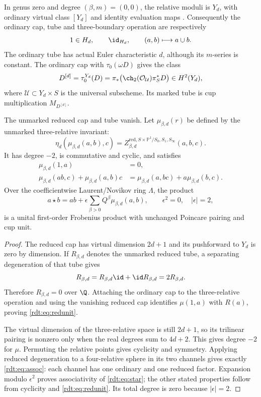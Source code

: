 In genus zero and degree $(\beta,m)=(0,0)$, the relative moduli is
$Y_d$, with ordinary virtual class $[Y_d]$ and identity evaluation
maps \cite[Lemma 5.2]{OberdieckMC}. Consequently the ordinary cap,
tube and three-boundary operation are respectively
\[
 1\in H_d,\qquad \id_{H_d},\qquad (a,b)\longmapsto a\cup b.
\]
The ordinary tube has actual Euler characteristic $d$, although its
$m$-series is constant. The ordinary cap with $\tau_0(\omega D)$
gives the class
\[
 D^{[d]}=\tau_0^{Y_d}(D)=\pi_*\bigl(\ch_2(\mathcal O_{\mathcal U})
                      \pi_S^*D\bigr)\in H^2(Y_d),
\]
where $\mathcal U\subset Y_d\times S$ is the universal subscheme.
Its marked tube is cup multiplication $M_{D^{[d]}}$.

\begin{proposition}
\label{rdt:prop:firstorder}
The unmarked reduced cap and tube vanish. Let $\mu_{\beta,d}(r)$
be defined by the unmarked three-relative invariant:
\[
 \eta_d(\mu_{\beta,d}(a,b),c)
   =Z^{\mathrm{red},S\times\mathbb P^1/S_0,S_1,S_\infty}_{\beta,d}(a,b,c).
\]
It has degree $-2$, is commutative and cyclic, and satisfies
\begin{align}
 \mu_{\beta,d}(1,a)&=0,\label{rdt:eq:redunit}\\
 \mu_{\beta,d}(ab,c)+\mu_{\beta,d}(a,b)c
  &=\mu_{\beta,d}(a,bc)+a\mu_{\beta,d}(b,c).
 \label{rdt:eq:assoc}
\end{align}
Over the coefficientwise Laurent/Novikov ring $\Lambda$, the product
\begin{equation}\label{rdt:eq:star}
 a\star b=ab+\epsilon\sum_{\beta>0}Q^\beta\mu_{\beta,d}(a,b),
 \qquad \epsilon^2=0,\quad |\epsilon|=2,
\end{equation}
is a unital first-order Frobenius product with unchanged Poincare
pairing and cup unit.
\end{proposition}
\begin{proof}
The reduced cap has virtual dimension $2d+1$ and its pushforward to
$Y_d$ is zero by dimension. If $R_{\beta,d}$ denotes the unmarked
reduced tube, a separating degeneration of that tube gives
\[
 R_{\beta,d}=R_{\beta,d}\id+\id R_{\beta,d}=2R_{\beta,d}.
\]
Therefore $R_{\beta,d}=0$ over $\Q$. Attaching the ordinary cap to
the three-relative operation and using the vanishing reduced cap
identifies $\mu(1,a)$ with $R(a)$, proving
\eqref{rdt:eq:redunit}.

The virtual dimension of the three-relative space is still $2d+1$,
so its trilinear pairing is nonzero only when the real degrees sum to
$4d+2$. This gives degree $-2$ for $\mu$. Permuting the relative
points gives cyclicity and symmetry. Applying reduced degeneration
to a four-relative sphere in its two channels gives exactly
\eqref{rdt:eq:assoc}: each channel has one ordinary and one reduced
factor. Expansion modulo $\epsilon^2$ proves associativity of
\eqref{rdt:eq:star}; the other stated properties follow from cyclicity
and \eqref{rdt:eq:redunit}. Its total degree is zero because
$|\epsilon|=2$.
\end{proof}

